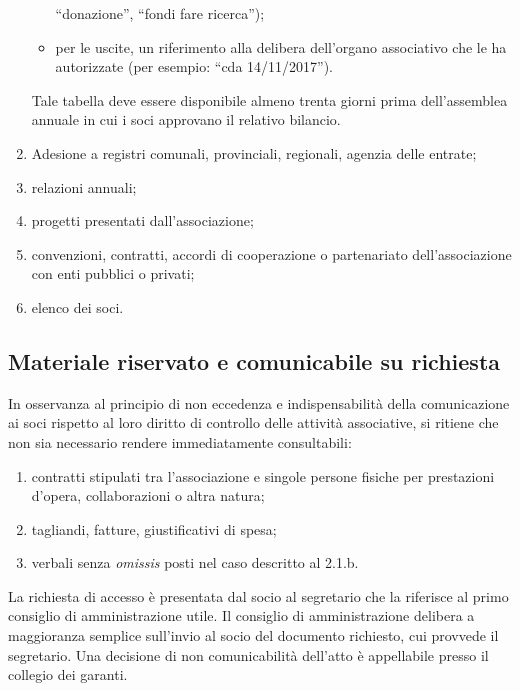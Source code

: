 \begin{enumerate}
\begin{itemize}
                ``donazione'', ``fondi fare ricerca'');
            \item per le uscite, un riferimento alla delibera dell'organo
                associativo che le ha autorizzate (per esempio: ``cda
                14/11/2017'').
        \end{itemize}
        Tale tabella deve essere disponibile almeno trenta giorni prima
        dell'assemblea annuale in cui i soci approvano il relativo bilancio.
    \item
        Adesione a registri comunali, provinciali, regionali, agenzia delle
        entrate;
    \item
        relazioni annuali;
    \item
        progetti presentati dall'associazione;
    \item
        convenzioni, contratti, accordi di cooperazione o partenariato
        dell'associazione con enti pubblici o privati;
    \item
        elenco dei soci.
\end{enumerate}

\subsection{Materiale riservato e comunicabile su
richiesta}\label{materiale-riservato-e-comunicabile-su-richiesta}

In osservanza al principio di non eccedenza e indispensabilità della
comunicazione ai soci rispetto al loro diritto di controllo delle
attività associative, si ritiene che non sia necessario rendere
immediatamente consultabili:

\begin{enumerate}
    \item
        contratti stipulati tra l'associazione e singole persone fisiche per
        prestazioni d'opera, collaborazioni o altra natura;
    \item
        tagliandi, fatture, giustificativi di spesa;
    \item
        verbali senza \emph{omissis} posti nel caso descritto al 2.1.b.
\end{enumerate}

La richiesta di accesso è presentata dal socio al segretario che la
riferisce al primo consiglio di amministrazione utile. Il consiglio di
amministrazione delibera a maggioranza semplice sull'invio al socio del
documento richiesto, cui provvede il segretario.
Una decisione di non comunicabilità dell'atto è appellabile presso il
collegio dei garanti.


